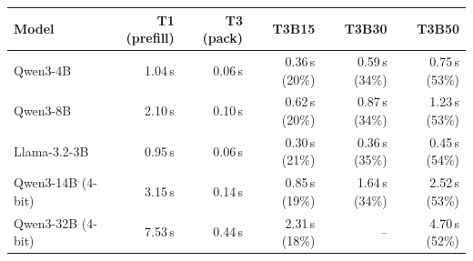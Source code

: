 \begin{tabular}{lrrrrr}
\toprule
Model & T1 (prefill) & T3 (pack) & T3B15 & T3B30 & T3B50 \\
\midrule
Qwen3-4B & 1.04\,s & 0.06\,s & 0.36\,s (20\%) & 0.59\,s (34\%) & 0.75\,s (53\%) \\
Qwen3-8B & 2.10\,s & 0.10\,s & 0.62\,s (20\%) & 0.87\,s (34\%) & 1.23\,s (53\%) \\
Llama-3.2-3B & 0.95\,s & 0.06\,s & 0.30\,s (21\%) & 0.36\,s (35\%) & 0.45\,s (54\%) \\
Qwen3-14B (4-bit) & 3.15\,s & 0.14\,s & 0.85\,s (19\%) & 1.64\,s (34\%) & 2.52\,s (53\%) \\
Qwen3-32B (4-bit) & 7.53\,s & 0.44\,s & 2.31\,s (18\%) & -- & 4.70\,s (52\%) \\
\bottomrule
\end{tabular}

